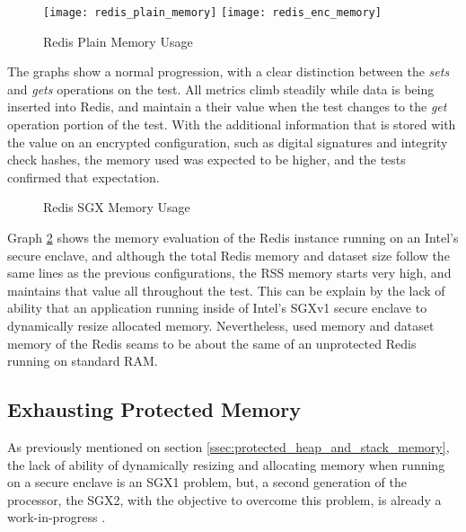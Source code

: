 \begin{figure}[htbp]
\hspace*{-8mm}
  \centering
    {\texttt{[image: redis\_plain\_memory]}}%
    {\texttt{[image: redis\_enc\_memory]}}%
  \caption{Redis Plain Memory Usage}
  \label{fig:redis_plain_enc_memory_results}
\end{figure}

The graphs show a normal progression, with a clear distinction between the \textit{sets} and \textit{gets} operations on the test. All metrics climb steadily while data is being inserted into Redis, and maintain a their value when the test changes to the \textit{get} operation portion of the test. With the additional information that is stored with the value on an encrypted configuration, such as digital signatures and integrity check hashes, the memory used was expected to be higher, and the tests confirmed that expectation.

\begin{figure}[htbp]
  \caption{Redis SGX Memory Usage}
  \label{fig:redis_sgx_memory}
\end{figure}

Graph \ref{fig:redis_sgx_memory} shows the memory evaluation of the Redis instance running on an Intel's secure enclave, and although the total Redis memory and dataset size follow the same lines as the previous configurations, the \gls{RSS} memory starts very high, and maintains that value all throughout the test. This can be explain by the lack of ability that an application running inside of Intel's \gls{SGX}v1 secure enclave to dynamically resize allocated memory. Nevertheless, used memory and dataset memory of the Redis seams to be about the same of an unprotected Redis running on standard \gls{RAM}.

\subsection{Exhausting Protected Memory}
\label{ssec:exhausting_protected_memory}

As previously mentioned on section \ref{ssec:protected_heap_and_stack_memory}, the lack of ability of dynamically resizing and allocating memory when running on a secure enclave is an \gls{SGX}1 problem, but, a second generation of the processor, the \gls{SGX}2, with the objective to overcome this problem, is already a work-in-progress \cite{Xing2016}.

